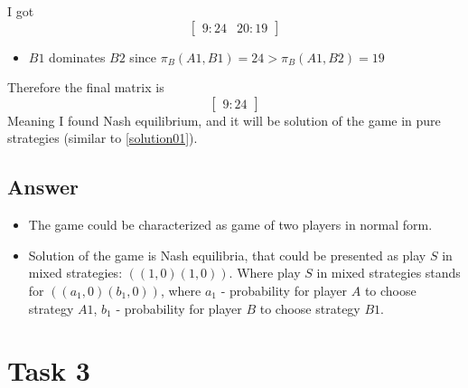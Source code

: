 \documentclass[
	a4paper, %
	11pt, %
]{CSUniSchoolLabReport}
\begin{document}
I got
$$
\begin{bmatrix}
    9:24 & 20:19
\end{bmatrix}
$$
\begin{itemize}
    \item $B1$ dominates $B2$ since $\pi_B(A1, B1) = 24 > \pi_B(A1, B2) = 19$
\end{itemize}\hspace{2pt}

Therefore the final matrix is
$$
\begin{bmatrix}
    9:24
\end{bmatrix}
$$
Meaning I found Nash equilibrium, and it will be solution of the game in pure strategies (similar to \ref{solution01}).

\subsection{Answer}\label{answer02}
\begin{itemize}
    \item The game could be characterized as game of two players in normal form.
    \item Solution of the game is Nash equilibria, that could be presented as play $S$ in mixed strategies: $((1, 0)(1, 0))$. Where play $S$ in mixed strategies stands for $((a_1, 0)(b_1, 0))$, where $a_1$ - probability for player $A$ to choose strategy $A1$, $b_1$ - probability for player $B$ to choose strategy $B1$.
\end{itemize}


\section{Task 3}
\end{document}
